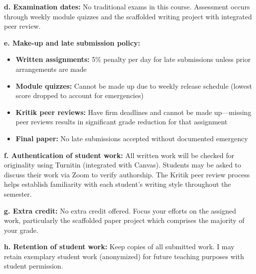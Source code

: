 \documentclass[12pt]{article}     %
\begin{document}
\vspace{1em}
\noindent \textbf{d. Examination dates:}
No traditional exams in this course. Assessment occurs through weekly module quizzes and the scaffolded writing project with integrated peer review.

\vspace{1em}
\noindent \textbf{e. Make-up and late submission policy:}
\begin{itemize}
\item \textbf{Written assignments:} 5\% penalty per day for late submissions unless prior arrangements are made
\item \textbf{Module quizzes:} Cannot be made up due to weekly release schedule (lowest score dropped to account for emergencies)
\item \textbf{Kritik peer reviews:} Have firm deadlines and cannot be made up---missing peer reviews results in significant grade reduction for that assignment
\item \textbf{Final paper:} No late submissions accepted without documented emergency
\end{itemize}

\vspace{1em}
\noindent \textbf{f. Authentication of student work:}
All written work will be checked for originality using Turnitin (integrated with Canvas). Students may be asked to discuss their work via Zoom to verify authorship. The Kritik peer review process helps establish familiarity with each student's writing style throughout the semester.

\vspace{1em}
\noindent \textbf{g. Extra credit:}
No extra credit offered. Focus your efforts on the assigned work, particularly the scaffolded paper project which comprises the majority of your grade.

\vspace{1em}
\noindent \textbf{h. Retention of student work:}
Keep copies of all submitted work. I may retain exemplary student work (anonymized) for future teaching purposes with student permission.

\end{document}
